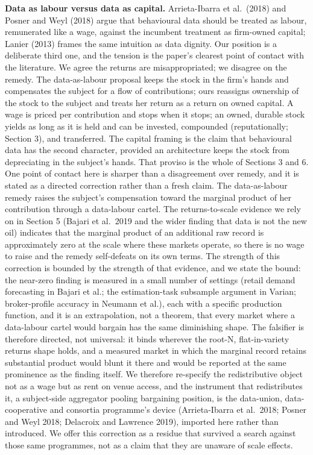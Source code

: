 \documentclass[
  11pt,
]{article}
\begin{document}
\textbf{Data as labour versus data as capital.} Arrieta-Ibarra et
al.~(2018) and Posner and Weyl (2018) argue that behavioural data should
be treated as labour, remunerated like a wage, against the incumbent
treatment as firm-owned capital; Lanier (2013) frames the same intuition
as data dignity. Our position is a deliberate third one, and the tension
is the paper's clearest point of contact with the literature. We agree
the returns are misappropriated; we disagree on the remedy. The
data-as-labour proposal keeps the stock in the firm's hands and
compensates the subject for a flow of contributions; ours reassigns
ownership of the stock to the subject and treats her return as a return
on owned capital. A wage is priced per contribution and stops when it
stops; an owned, durable stock yields as long as it is held and can be
invested, compounded (reputationally; Section 3), and transferred. The
capital framing is the claim that behavioural data has the second
character, provided an architecture keeps the stock from depreciating in
the subject's hands. That proviso is the whole of Sections 3 and 6. One
point of contact here is sharper than a disagreement over remedy, and it
is stated as a directed correction rather than a fresh claim. The
data-as-labour remedy raises the subject's compensation toward the
marginal product of her contribution through a data-labour cartel. The
returns-to-scale evidence we rely on in Section 5 (Bajari et al.~2019
and the wider finding that data is not the new oil) indicates that the
marginal product of an additional raw record is approximately zero at
the scale where these markets operate, so there is no wage to raise and
the remedy self-defeats on its own terms. The strength of this
correction is bounded by the strength of that evidence, and we state the
bound: the near-zero finding is measured in a small number of settings
(retail demand forecasting in Bajari et al.; the estimation-task
subsample argument in Varian; broker-profile accuracy in Neumann et
al.), each with a specific production function, and it is an
extrapolation, not a theorem, that every market where a data-labour
cartel would bargain has the same diminishing shape. The falsifier is
therefore directed, not universal: it binds wherever the root-N,
flat-in-variety returns shape holds, and a measured market in which the
marginal record retains substantial product would blunt it there and
would be reported at the same prominence as the finding itself. We
therefore re-specify the redistributive object not as a wage but as rent
on venue access, and the instrument that redistributes it, a
subject-side aggregator pooling bargaining position, is the data-union,
data-cooperative and consortia programme's device (Arrieta-Ibarra et
al.~2018; Posner and Weyl 2018; Delacroix and Lawrence 2019), imported
here rather than introduced. We offer this correction as a residue that
survived a search against those same programmes, not as a claim that
they are unaware of scale effects.
\end{document}
